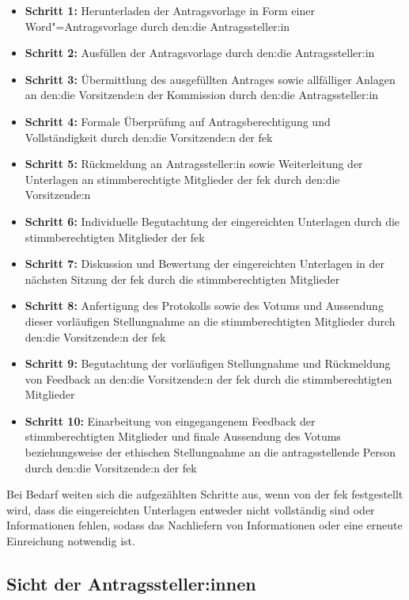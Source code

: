 \documentclass[a4paper,12pt,twoside]{scrreprt}
\begin{document}
\begin{itemize}
    \item \textbf{Schritt 1:} Herunterladen der Antragsvorlage in Form einer Word"=Antragsvorlage durch den:die Antragssteller:in
    \item \textbf{Schritt 2:} Ausfüllen der Antragsvorlage durch den:die Antragssteller:in
    \item \textbf{Schritt 3:} Übermittlung des ausgefüllten Antrages sowie allfälliger Anlagen an den:die Vorsitzende:n der Kommission durch den:die Antragssteller:in
    \item \textbf{Schritt 4:} Formale Überprüfung auf Antragsberechtigung und Vollständigkeit durch den:die Vorsitzende:n der \ac{fek}
    \item \textbf{Schritt 5:} Rückmeldung an Antragssteller:in sowie Weiterleitung der Unterlagen an stimmberechtigte Mitglieder der \ac{fek} durch den:die Vorsitzende:n
    \item \textbf{Schritt 6:} Individuelle Begutachtung der eingereichten Unterlagen durch die stimmberechtigten Mitglieder der \ac{fek}
    \item \textbf{Schritt 7:} Diskussion und Bewertung der eingereichten Unterlagen in der nächsten Sitzung der \ac{fek} durch die stimmberechtigten Mitglieder
    \item \textbf{Schritt 8:} Anfertigung des Protokolls sowie des Votums und Aussendung dieser vorläufigen Stellungnahme an die stimmberechtigten Mitglieder durch den:die Vorsitzende:n der \ac{fek}
    \item \textbf{Schritt 9:} Begutachtung der vorläufigen Stellungnahme und Rückmeldung von Feedback an den:die Vorsitzende:n der \ac{fek} durch die stimmberechtigten Mitglieder
    \item \textbf{Schritt 10:} Einarbeitung von eingegangenem Feedback der stimmberechtigten Mitglieder und finale Aussendung des Votums beziehungsweise der ethischen Stellungnahme an die antragsstellende Person durch den:die Vorsitzende:n der \ac{fek}
\end{itemize}

Bei Bedarf weiten sich die aufgezählten Schritte aus, wenn von der \ac{fek} festgestellt wird, dass die eingereichten Unterlagen entweder nicht vollständig sind oder Informationen fehlen, sodass das Nachliefern von Informationen oder eine erneute Einreichung notwendig ist.

\subsection{Sicht der Antragssteller:innen}
\label{sub-sec:ablauf-sicht-antragssteller}
\end{document}
